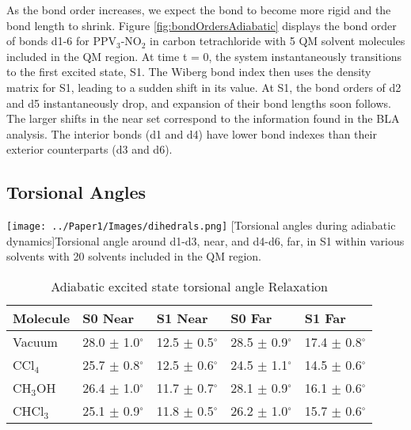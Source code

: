 As the bond order increases, we expect the bond to become more rigid and the bond length to shrink.
Figure \ref{fig:bondOrdersAdiabatic} displays the bond order of bonds d1-6 for PPV\(_3\)-NO\(_2\) in carbon tetrachloride with 5 QM solvent molecules included in the QM region.
At time t = 0, the system instantaneously transitions to the first excited state, S1.
The Wiberg bond index then uses the density matrix for S1, leading to a sudden shift in its value.
At S1, the bond orders of d2 and d5 instantaneously drop, and expansion of their bond lengths soon follows.
The larger shifts in the near set correspond to the information found in the BLA analysis.
The interior bonds (d1 and d4) have lower bond indexes than their exterior counterparts (d3 and d6).

\subsection{Torsional Angles}

\noindent
\begin{minipage}[c]{\textwidth}
  \centering
  \texttt{[image: ../Paper1/Images/dihedrals.png]}
  [Torsional angles during adiabatic dynamics]{Torsional angle around d1-d3, near, and d4-d6, far, in S1 within various solvents with 20 solvents included in the QM region.}
  \label{fig:dihedralAdiabatic}
\end{minipage}\bigskip

\begin{table}[H]
  \caption{Adiabatic excited state torsional angle Relaxation} \label{tab:adiabaticDihedrals}
  \begin{tabularx}{\textwidth}{XXXXX}\hline
    Molecule    & S0 Near  & S1 Near & S0 Far & S1 Far\\\hline
    Vacuum      & 28.0 \(\pm\) 1.0\(^\circ\) & 12.5 \(\pm\) 0.5\(^\circ\) & 28.5 \(\pm\) 0.9\(^\circ\) & 17.4 \(\pm\) 0.8\(^\circ\)\\
    CCl\(_4\)  & 25.7 \(\pm\) 0.8\(^\circ\)  & 12.5 \(\pm\) 0.6\(^\circ\) & 24.5 \(\pm\) 1.1\(^\circ\) & 14.5 \(\pm\) 0.6\(^\circ\)\\
    CH\(_3\)OH  & 26.4 \(\pm\) 1.0\(^\circ\)  & 11.7 \(\pm\) 0.7\(^\circ\) & 28.1 \(\pm\) 0.9\(^\circ\) & 16.1 \(\pm\) 0.6\(^\circ\)\\
    CHCl\(_3\)  & 25.1 \(\pm\) 0.9\(^\circ\)  & 11.8 \(\pm\) 0.5\(^\circ\) & 26.2 \(\pm\) 1.0\(^\circ\) & 15.7 \(\pm\) 0.6\(^\circ\)\\\hline
  \end{tabularx}
\end{table}

